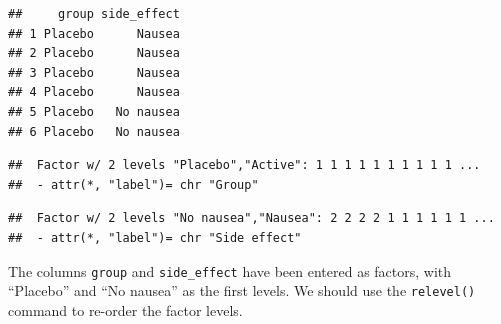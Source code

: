 \documentclass[
]{memoir}
\newenvironment{Shaded}{\begin{snugshade}}{\end{snugshade}}
\newcommand{\AttributeTok}[1]{\textcolor[rgb]{0.77,0.63,0.00}{#1}}
\newcommand{\FunctionTok}[1]{\textcolor[rgb]{0.00,0.00,0.00}{#1}}
\newcommand{\NormalTok}[1]{#1}
\newcommand{\OtherTok}[1]{\textcolor[rgb]{0.56,0.35,0.01}{#1}}
\newcommand{\SpecialCharTok}[1]{\textcolor[rgb]{0.00,0.00,0.00}{#1}}
\newcommand{\StringTok}[1]{\textcolor[rgb]{0.31,0.60,0.02}{#1}}
\begin{document}
\begin{verbatim}
##     group side_effect
## 1 Placebo      Nausea
## 2 Placebo      Nausea
## 3 Placebo      Nausea
## 4 Placebo      Nausea
## 5 Placebo   No nausea
## 6 Placebo   No nausea
\end{verbatim}

\begin{Shaded}
\end{Shaded}

\begin{verbatim}
##  Factor w/ 2 levels "Placebo","Active": 1 1 1 1 1 1 1 1 1 1 ...
##  - attr(*, "label")= chr "Group"
\end{verbatim}

\begin{Shaded}
\end{Shaded}

\begin{verbatim}
##  Factor w/ 2 levels "No nausea","Nausea": 2 2 2 2 1 1 1 1 1 1 ...
##  - attr(*, "label")= chr "Side effect"
\end{verbatim}

The columns \texttt{group} and \texttt{side\_effect} have been entered as factors, with ``Placebo'' and ``No nausea'' as the first levels. We should use the \texttt{relevel()} command to re-order the factor levels.

\begin{Shaded}
\end{Shaded}
\end{document}
